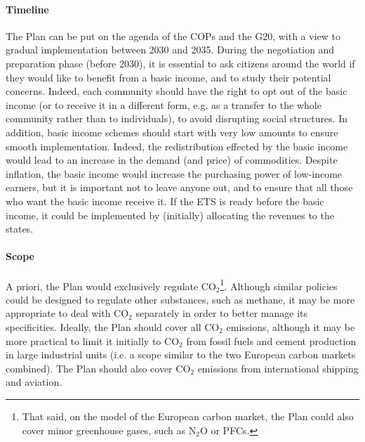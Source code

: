 \documentclass[a5paper,english,openany]{memoir}
\begin{document}
\paragraph{Timeline} 
The Plan can be put on the agenda of the COPs and the G20, with a view to gradual implementation between 2030 and 2035. During the negotiation and preparation phase (before 2030), it is essential to ask citizens around the world if they would like to benefit from a basic income, and to study their potential concerns. Indeed, each community should have the right to opt out of the basic income (or to receive it in a different form, e.g. as a transfer to the whole community rather than to individuals), to avoid disrupting social structures. In addition, basic income schemes should start with very low amounts to ensure smooth implementation. Indeed, the redistribution effected by the basic income would lead to an increase in the demand (and price) of commodities. Despite inflation, the basic income would increase the purchasing power of low-income earners, but it is important not to leave anyone out, and to ensure that all those who want the basic income receive it. If the ETS is ready before the basic income, it could be implemented by (initially) allocating the revenues to the states.

\paragraph{Scope} 
A priori, the Plan would exclusively regulate CO$_\text{2}$\footnote{That said, on the model of the European carbon market, the Plan could also cover minor greenhouse gases, such as N$_\text{2}$O or PFCs.}. Although similar policies could be designed to regulate other substances, such as methane, it may be more appropriate to deal with CO$_\text{2}$ separately in order to better manage its specificities. Ideally, the Plan should cover all CO$_\text{2}$ emissions, although it may be more practical to limit it initially to CO$_\text{2}$ from fossil fuels and cement production in large industrial units (i.e. a scope similar to the two European carbon markets combined). The Plan should also cover CO$_\text{2}$ emissions from international shipping and aviation. 
\end{document}
